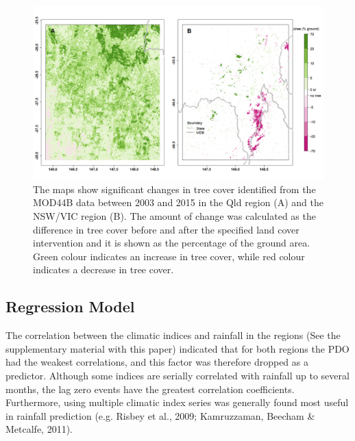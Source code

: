 \documentclass[fleqn,10pt,lineno]{wlpeerj} %
\theoremstyle{definition}
\theoremstyle{definition}
\theoremstyle{definition}
\theoremstyle{remark}
\begin{document}
\begin{figure}
\includegraphics[width=0.9\linewidth]{figures/Fig5} \caption{The maps show significant changes in tree cover identified from the MOD44B data between 2003 and 2015 in the Qld region (A) and the NSW/VIC region (B). The amount of change was calculated as the difference in tree cover before and after the specified land cover intervention and it is shown as the percentage of the ground area. Green colour indicates an increase in tree cover, while red colour indicates a decrease in tree cover.}\label{fig:tctrend}
\end{figure}

\subsection{Regression Model}\label{regression-model}

The correlation between the climatic indices and rainfall in the regions
(See the supplementary material with this paper) indicated that for both
regions the PDO had the weakest correlations, and this factor was
therefore dropped as a predictor. Although some indices are serially
correlated with rainfall up to several months, the lag zero events have
the greatest correlation coefficients. Furthermore, using multiple
climatic index series was generally found most useful in rainfall
prediction (e.g. Risbey et al., 2009; Kamruzzaman, Beecham \& Metcalfe,
2011).
\end{document}
